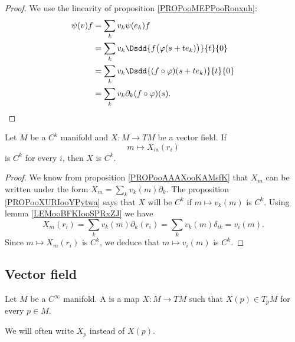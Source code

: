 \begin{proof}
	We use the linearity of proposition \ref{PROPooMEPPooRonxuh}:
	\begin{subequations}
		\begin{align}
			\psi(v)f & =\sum_kv_k\psi(e_k)f                                  \\
			         & =\sum_kv_k\Dsdd{ f\big( \varphi(s+te_k) \big) }{t}{0} \\
			         & =\sum_kv_k\Dsdd{ (f\circ\varphi)(s+te_k) }{t}{0}      \\
			         & =\sum_kv_k\partial_k(f\circ\varphi)(s).
		\end{align}
	\end{subequations}
\end{proof}


\begin{proposition}	\label{PROPooYGHAooWOXbRu}
	Let \( M\) be a \( C^k\) manifold and \(X \colon M\to TM  \) be a vector field. If
	\begin{equation}
		m\mapsto X_m(r_i)
	\end{equation}
	is \( C^k\) for every \( i\), then \( X\) is \( C^k\).
\end{proposition}

\begin{proof}
	We know from proposition \ref{PROPooAAAXooKAMsfK} that \( X_m\) can be written under the form \( X_m=\sum_kv_k(m)\partial_k\). The proposition \ref{PROPooXURIooYPytwa} says that \( X\) will be \( C^k\) if \( m\mapsto v_k(m)\) is \( C^k\). Using lemma \ref{LEMooBFKIooSPRxZJ} we have
	\begin{equation}
		X_m(r_i)=\sum_kv_k(m)\partial_k(r_i)=\sum_kv_k(m)\delta_{ik}=v_i(m).
	\end{equation}
	Since \( m\mapsto X_m(r_i)\) is \( C^k\), we deduce that \( m\mapsto v_i(m)\) is \( C^k\).
\end{proof}


\subsection{Vector field}

\begin{definition}        \label{DEFooAATTooLhNqDb}
	Let \( M\) be a \(  C^{\infty}\) manifold. A  is a map \( X\colon M\to TM\) such that \( X(p)\in T_pM\) for every \( p\in M\).

	We will often write \( X_p\) instead of \( X(p)\).
\end{definition}



